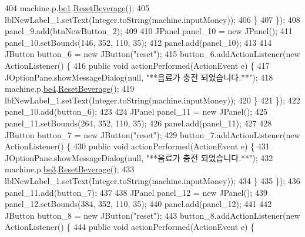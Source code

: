 \begin{DoxyCode}
404                 machine.p.\hyperlink{classsehw1_1_1product_a78de5ce35a2661747de59366b041bf28}{be1}.\hyperlink{classsehw1_1_1beverage_a6082e0786cc6b8d805856372e768575e}{ResetBeverage}();
405                 lblNewLabel\_1.setText(Integer.toString(machine.inputMoney));
406             \}
407         \});
408         panel\_9.add(btnNewButton\_2);
409         
410         JPanel panel\_10 = \textcolor{keyword}{new} JPanel();
411         panel\_10.setBounds(146, 352, 110, 35);
412         panel.add(panel\_10);
413         
414         JButton button\_6 = \textcolor{keyword}{new} JButton(\textcolor{stringliteral}{"reset"});
415         button\_6.addActionListener(\textcolor{keyword}{new} ActionListener() \{
416             \textcolor{keyword}{public} \textcolor{keywordtype}{void} actionPerformed(ActionEvent e) \{
417                 JOptionPane.showMessageDialog(null, \textcolor{stringliteral}{"**음료가 충전 되었습니다.**"});
418                 machine.p.\hyperlink{classsehw1_1_1product_acfca06ee7a734ee15073262cb8fa1c24}{be4}.\hyperlink{classsehw1_1_1beverage_a6082e0786cc6b8d805856372e768575e}{ResetBeverage}();
419                 lblNewLabel\_1.setText(Integer.toString(machine.inputMoney));
420             \}
421         \});
422         panel\_10.add(button\_6);
423         
424         JPanel panel\_11 = \textcolor{keyword}{new} JPanel();
425         panel\_11.setBounds(264, 352, 110, 35);
426         panel.add(panel\_11);
427         
428         JButton button\_7 = \textcolor{keyword}{new} JButton(\textcolor{stringliteral}{"reset"});
429         button\_7.addActionListener(\textcolor{keyword}{new} ActionListener() \{
430             \textcolor{keyword}{public} \textcolor{keywordtype}{void} actionPerformed(ActionEvent e) \{
431                 JOptionPane.showMessageDialog(null, \textcolor{stringliteral}{"**음료가 충전 되었습니다.**"});
432                 machine.p.\hyperlink{classsehw1_1_1product_a15f8a47cd14f9b7fc8faf4fa5836d125}{be3}.\hyperlink{classsehw1_1_1beverage_a6082e0786cc6b8d805856372e768575e}{ResetBeverage}();
433                 lblNewLabel\_1.setText(Integer.toString(machine.inputMoney));
434             \}
435         \});
436         panel\_11.add(button\_7);
437         
438         JPanel panel\_12 = \textcolor{keyword}{new} JPanel();
439         panel\_12.setBounds(384, 352, 110, 35);
440         panel.add(panel\_12);
441         
442         JButton button\_8 = \textcolor{keyword}{new} JButton(\textcolor{stringliteral}{"reset"});
443         button\_8.addActionListener(\textcolor{keyword}{new} ActionListener() \{
444             \textcolor{keyword}{public} \textcolor{keywordtype}{void} actionPerformed(ActionEvent e) \{

\end{DoxyCode}
